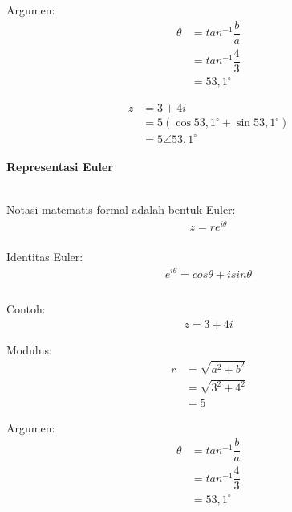\documentclass{article}
\begin{document}
    Argumen:
    \begin{align}
        \theta  &= tan^{-1} \dfrac{b}{a}
                \nonumber\\
                &= tan^{-1} \dfrac{4}{3}
                \nonumber\\
                &= 53,1^{\circ}
                \nonumber
    \end{align}

    \begin{align}
        z   &= 3 + 4i
            \nonumber\\
            &= 5(\cos 53,1^{\circ} + \sin 53,1^{\circ})
            \nonumber\\
            &= 5 \angle 53,1^{\circ}
    \end{align}

    \newpage
    \begin{center}
        \textbf{Representasi Euler}
    \end{center}
    \leavevmode\\

    Notasi matematis formal adalah bentuk Euler:
    \begin{align}
        z = re^{i\theta}\\\nonumber
    \end{align}

    Identitas Euler:
    \begin{align}
        e^{i\theta} = cos\theta + i sin\theta \\\nonumber
    \end{align}
    \leavevmode\\

    Contoh:
    \begin{align}
        z = 3 + 4i \nonumber
    \end{align}

    Modulus:
    \begin{align}
        r   &= \sqrt{a^2 + b^2}
            \nonumber\\
            &= \sqrt{3^2 + 4^2}
            \nonumber\\
            &= 5
            \nonumber
    \end{align}
    
    Argumen:
    \begin{align}
        \theta  &= tan^{-1} \dfrac{b}{a}
                \nonumber\\
                &= tan^{-1} \dfrac{4}{3}
                \nonumber\\
                &= 53,1^{\circ}
                \nonumber
    \end{align}
\end{document}
